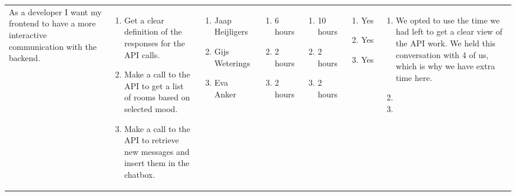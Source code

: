 \documentclass[11pt,a4paper,landscape]{article}
\begin{document}
\begin{table}[h]
\begin{tabular}{|p{3cm}|p{5.0cm}|p{3.0cm}|p{2.2cm}|p{2.2cm}|p{2.0cm}|p{5cm}}
As a developer I want my frontend to have a more interactive communication with the backend.
&
\begin{enumerate}
\item Get a clear definition of the responses for the API calls.
\item Make a call to the API to get a list of rooms based on selected mood.
\item Make a call to the API to retrieve new messages and insert them in the chatbox.
\end{enumerate}

&

\begin{enumerate}
\item Jaap Heijligers
\item Gijs Weterings
\item Eva Anker
\end{enumerate}

&
\begin{enumerate}
\item 6 hours
\item 2 hours
\item 2 hours
\end{enumerate}
&
\begin{enumerate}
\item 10 hours
\item 2 hours
\item 2 hours
\end{enumerate}
&
\begin{enumerate}
\item Yes
\item Yes
\item Yes
\end{enumerate}
&
\begin{enumerate}
\item We opted to use the time we had left to get a clear view of the API work. We held this conversation with 4 of us, which is why we have extra time here.
\item 
\item 
\end{enumerate}
\end{tabular}
\end{table}
\end{document}

